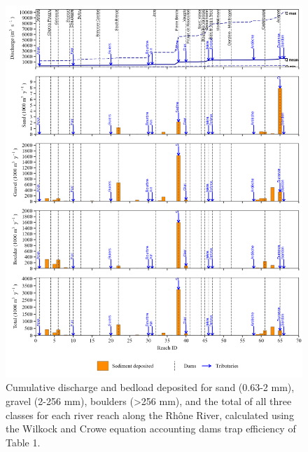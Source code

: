 \documentclass[
]{book}
\begin{document}
\begin{figure}
\includegraphics[width=26.24in]{img/res_cascade/res_E2_eW&C/plots_dep-silt/dep_res_sum_hy_E2_eW&C} \caption{Cumulative discharge and bedload deposited for sand (0.63-2 mm), gravel (2-256 mm), boulders (>256 mm), and the total of all three classes for each river reach along the Rhône River, calculated using the Wilkock and Crowe equation accounting dams trap efficiency of Table 1.}\label{fig:DepE2eW}
\end{figure}
\end{document}
